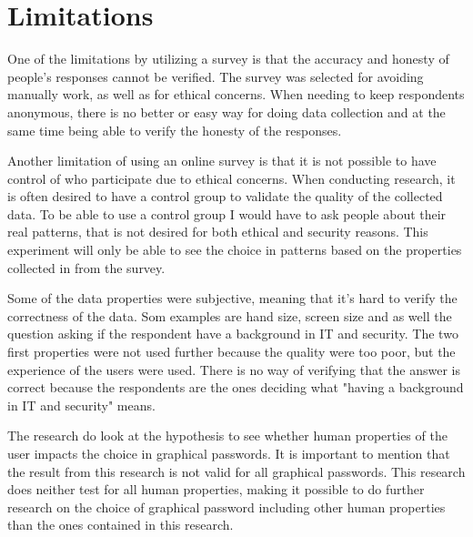   \section{Limitations}\label{sec:limitations}
    One of the limitations by utilizing a survey is that the accuracy and honesty of people's responses cannot be verified. The survey was selected for avoiding manually work, as well as for ethical concerns. When needing to keep respondents anonymous, there is no better or easy way for doing data collection and at the same time being able to verify the honesty of the responses. 

    Another limitation of using an online survey is that it is not possible to have control of who participate due to ethical concerns. When conducting research, it is often desired to have a control group to validate the quality of the collected data. To be able to use a control group I would have to ask people about their real patterns, that is not desired for both ethical and security reasons. This experiment will only be able to see the choice in patterns based on the properties collected in from the survey.

    Some of the data properties were subjective, meaning that it's hard to verify the correctness of the data. Som examples are hand size, screen size and as well the question asking if the respondent have a background in IT and security. The two first properties were not used further because the quality were too poor, but the experience of the users were used. There is no way of verifying that the answer is correct because the respondents are the ones deciding what "having a background in IT and security" means. 

    The research do look at the hypothesis to see whether human properties of the user impacts the choice in graphical passwords. It is important to mention that the result from this research is not valid for all graphical passwords. This research does neither test for all human properties, making it possible to do further research on the choice of graphical password including other human properties than the ones contained in this research. 

